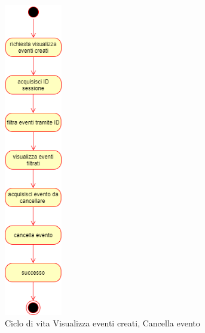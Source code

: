 \documentclass[11pt]{article}
\begin{document}
\begin{figure}[H]
\centering
\includegraphics[width=0.225\textwidth]{Ciclo di vita Visualizza eventi creati, Cancella evento.png}
\caption{Ciclo di vita Visualizza eventi creati, Cancella evento}
\end{figure}
\end{document}
